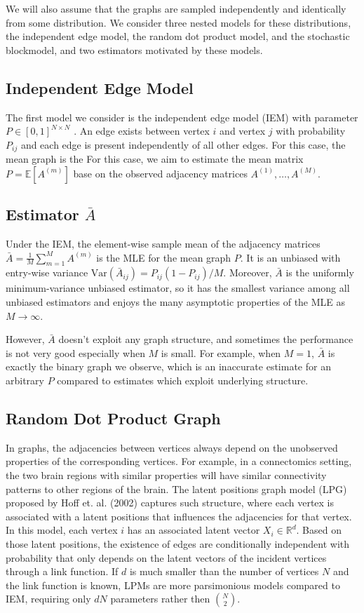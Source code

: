 \documentclass[a4paper]{article}
\newcommand{\Ex}{\mathbb{E}}
\begin{document}
We will also assume that the graphs are sampled independently and identically from some distribution.
We consider three nested models for these distributions, the independent edge model, the random dot product model, and the stochastic blockmodel, and two estimators motivated by these models.



\subsection{Independent Edge Model}
The first model we consider is the independent edge model (IEM) with parameter $P \in [0,1]^{N\times N}$ \citep{bollobas2007phase}.
An edge exists between vertex $i$ and vertex $j$ with probability $P_{ij}$ and each edge is present independently of all other edges. 
For this case, the mean graph is the 
For this case, we aim to estimate the mean matrix $P=\Ex[A^{(m)}]$ base on the observed adjacency matrices $A^{(1)},\dotsc,A^{(M)}$.



\subsection{Estimator $\bar{A}$}
Under the IEM, the element-wise sample mean of the adjacency matrices $\bar{A}=\frac{1}{M}\sum_{m=1}^M A^{(m)}$ is the MLE for the mean graph $P$.
It is an unbiased with entry-wise variance $\mathrm{Var}(\bar{A}_{ij}) = P_{ij} (1-P_{ij})/M$. Moreover, $\bar{A}$ is the uniformly minimum-variance unbiased estimator, so it has the smallest variance among all unbiased estimators and enjoys the many asymptotic properties of the MLE as $M\to \infty$.

However, $\bar{A}$ doesn't exploit any graph structure, and sometimes the performance is not very good especially when $M$ is small. 
For example, when $M=1$, $\bar{A}$ is exactly the binary graph we observe, which is an inaccurate estimate for an arbitrary $P$ compared to estimates which exploit underlying structure.



\subsection{Random Dot Product Graph}
In graphs, the adjacencies between vertices always depend on the unobserved properties of the corresponding vertices. For example, in a connectomics setting, the two brain regions with similar properties will have similar connectivity patterns to other regions of the brain.
The latent positions graph model (LPG) proposed by Hoff et. al. (2002) \cite{hoff2002latent} captures such structure, where each vertex is associated with a latent positions that influences the adjacencies for that vertex.
In this model, each vertex $i$ has an associated latent vector $X_i \in \mathbb{R}^d$.
Based on those latent positions, the existence of edges are conditionally independent with probability that only depends on the latent vectors of the incident vertices through a link function. If $d$ is much smaller than the number of vertices $N$ and the link function is known, LPMs are more parsimonious models compared to IEM, requiring only $dN$ parameters rather then $\binom{N}{2}$.
\end{document}
